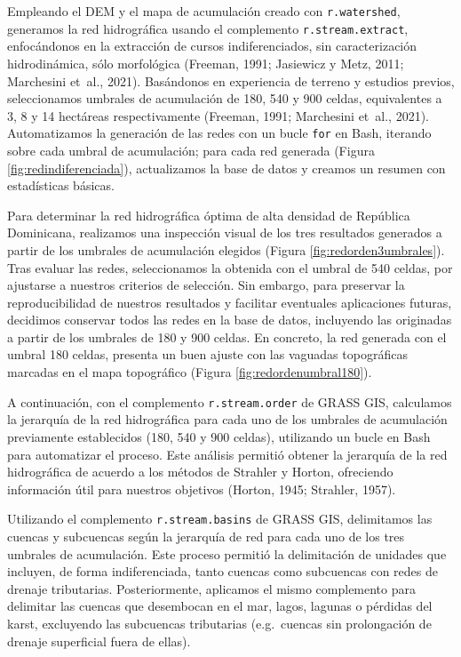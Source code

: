 \documentclass[spanish]{article}
\begin{document}
Empleando el DEM y el mapa de acumulación creado con
\texttt{r.watershed}, generamos la red hidrográfica usando el
complemento \texttt{r.stream.extract}, enfocándonos en la extracción de
cursos indiferenciados, sin caracterización hidrodinámica, sólo
morfológica (Freeman, 1991; Jasiewicz y Metz, 2011; Marchesini et~al.,
2021). Basándonos en experiencia de terreno y estudios previos,
seleccionamos umbrales de acumulación de 180, 540 y 900 celdas,
equivalentes a 3, 8 y 14 hectáreas respectivamente (Freeman, 1991;
Marchesini et~al., 2021). Automatizamos la generación de las redes con
un bucle \texttt{for} en Bash, iterando sobre cada umbral de
acumulación; para cada red generada (Figura
\ref{fig:redindiferenciada}), actualizamos la base de datos y creamos un
resumen con estadísticas básicas.

Para determinar la red hidrográfica óptima de alta densidad de República
Dominicana, realizamos una inspección visual de los tres resultados
generados a partir de los umbrales de acumulación elegidos (Figura
\ref{fig:redorden3umbrales}). Tras evaluar las redes, seleccionamos la
obtenida con el umbral de 540 celdas, por ajustarse a nuestros criterios
de selección. Sin embargo, para preservar la reproducibilidad de
nuestros resultados y facilitar eventuales aplicaciones futuras,
decidimos conservar todos las redes en la base de datos, incluyendo las
originadas a partir de los umbrales de 180 y 900 celdas. En concreto, la
red generada con el umbral 180 celdas, presenta un buen ajuste con las
vaguadas topográficas marcadas en el mapa topográfico (Figura
\ref{fig:redordenumbral180}).

A continuación, con el complemento \texttt{r.stream.order} de GRASS GIS,
calculamos la jerarquía de la red hidrográfica para cada uno de los
umbrales de acumulación previamente establecidos (180, 540 y 900
celdas), utilizando un bucle en Bash para automatizar el proceso. Este
análisis permitió obtener la jerarquía de la red hidrográfica de acuerdo
a los métodos de Strahler y Horton, ofreciendo información útil para
nuestros objetivos (Horton, 1945; Strahler, 1957).

Utilizando el complemento \texttt{r.stream.basins} de GRASS GIS,
delimitamos las cuencas y subcuencas según la jerarquía de red para cada
uno de los tres umbrales de acumulación. Este proceso permitió la
delimitación de unidades que incluyen, de forma indiferenciada, tanto
cuencas como subcuencas con redes de drenaje tributarias.
Posteriormente, aplicamos el mismo complemento para delimitar las
cuencas que desembocan en el mar, lagos, lagunas o pérdidas del karst,
excluyendo las subcuencas tributarias (e.g.~cuencas sin prolongación de
drenaje superficial fuera de ellas).
\end{document}
